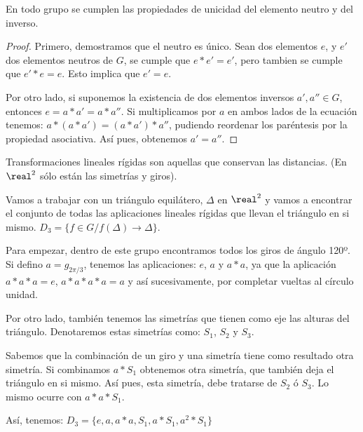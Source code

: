 \documentclass[nochap]{apuntes}
\begin{document}
  
  \begin{theorem}
   En todo grupo se cumplen las propiedades de unicidad del elemento neutro y del inverso.
  \end{theorem}
  
  \begin{proof}
 Primero, demostramos que el neutro es único. Sean dos elementos $e$, y $e'$ dos elementos neutros de $G$, se cumple que $e\ast e'=e'$, pero tambien se cumple que $e'\ast e=e$. Esto implica que $e'=e$.

 Por otro lado, si suponemos la existencia de dos elementos inversos $a',a''\in G$, entonces $e=a\ast a'=a\ast a''$. Si multiplicamos por $a$ en ambos lados de la ecuación tenemos: $a\ast (a\ast a')=(a\ast a')\ast a''$, pudiendo reordenar los paréntesis por la 
 propiedad asociativa. Así pues, obtenemos $a'=a''$.
  \end{proof}
  
 \begin{defn}
  Transformaciones lineales rígidas son aquellas que conservan las distancias. (En $\real^{2}$  sólo están las simetrías y giros).
 \end{defn}
 
 \begin{example} 
  Vamos a trabajar con un triángulo equilátero, $\Delta$  en $\real^{2}$  y vamos a encontrar el conjunto de todas las aplicaciones lineales rígidas 
  que llevan el triángulo en si mismo. $D_{3}=\{f\in G / f(\Delta)\longrightarrow\Delta\}$.
  
  Para empezar, dentro de este grupo encontramos todos los giros de ángulo 120º. Si defino $a=g_{2\pi/3}$, tenemos las aplicaciones:
  $e$, $a$  y $a\ast a$, ya que la aplicación $a\ast a\ast a=e$, $a\ast a\ast a\ast a=a$  y así sucesivamente, por completar vueltas al círculo unidad.
  
  Por otro lado, también tenemos las simetrías que tienen como eje las alturas del triángulo. Denotaremos estas simetrías como: $S_{1}$, $S_{2}$  y $S_{3}$.
  
  Sabemos que la combinación de un giro y una simetría tiene como resultado otra simetría. Si combinamos $a\ast S_{1}$  obtenemos otra simetría, que también deja el triángulo en si mismo. Así pues, esta simetría, debe tratarse de $S_{2}$  ó $S_{3}$. Lo mismo ocurre con $a\ast a\ast S_{1}$.
  
  Así, tenemos: $D_{3}=\{e, a, a\ast a, S_{1}, a\ast S_{1}, a^{2}\ast S_{1}\}$
 \end{example}
\end{document}
